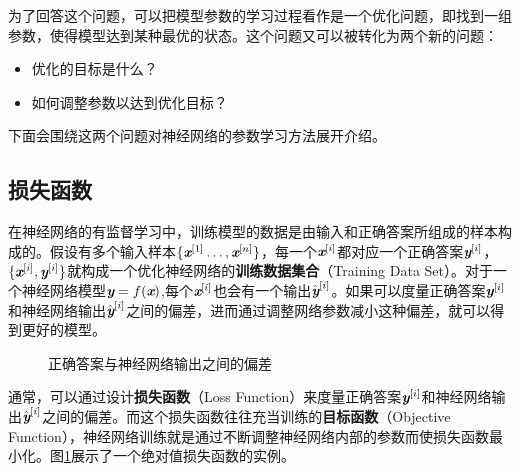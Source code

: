 \vspace{-2.5em}
\parinterval 为了回答这个问题，可以把模型参数的学习过程看作是一个优化问题，即找到一组参数，使得模型达到某种最优的状态。这个问题又可以被转化为两个新的问题：

\begin{itemize}
\vspace{0.5em}
\item 优化的目标是什么？
\vspace{0.5em}
\item 如何调整参数以达到优化目标？
\vspace{0.5em}
\end{itemize}

\parinterval 下面会围绕这两个问题对神经网络的参数学习方法展开介绍。


\subsection{损失函数}

\parinterval 在神经网络的有监督学习中，训练模型的数据是由输入和正确答案所组成的样本构成的。假设有多个输入样本$ \{{\textbf{\em x}}^{[1]}\dots,{\textbf{\em x}}^{[n]}\} $，每一个$ {\textbf{\em x}}^{[i]}$都对应一个正确答案$ {\textbf{\em y}}^{[i]} $，$ \{{\textbf{\em x}}^{[i]},{\textbf{\em y}}^{[i]}\} $就构成一个优化神经网络的{\small\sffamily\bfseries{训练数据集合}}（Training Data Set）。对于一个神经网络模型${\textbf{\em y}}=f({\textbf{\em x}}) $,每个$ {\textbf{\em x}}^{[i]} $也会有一个输出$ {\hat{\textbf{\em y}}}^{[i]} $。如果可以度量正确答案$ {\textbf{\em y}}^{[i]} $和神经网络输出$ {\hat{\textbf{\em y}}}^{[i]} $之间的偏差，进而通过调整网络参数减小这种偏差，就可以得到更好的模型。

\begin{figure}[htp]
\centering

\caption{正确答案与神经网络输出之间的偏差}
\label{fig:9-42}
\end{figure}

\parinterval 通常，可以通过设计{\small\sffamily\bfseries{损失函数}}（Loss Function）来度量正确答案$ {\textbf{\em y}}^{[i]} $和神经网络输出$ {\hat{\textbf{\em y}}}^{[i]} $之间的偏差。而这个损失函数往往充当训练的{\small\sffamily\bfseries{目标函数}}（Objective Function），神经网络训练就是通过不断调整神经网络内部的参数而使损失函数最小化。图\ref{fig:9-42}展示了一个绝对值损失函数的实例。

